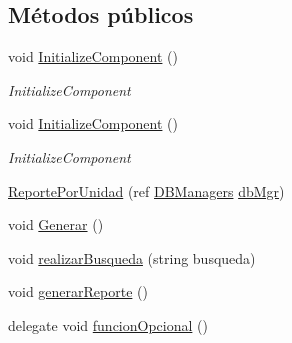 \subsection*{Métodos públicos}
\begin{DoxyCompactItemize}
\item 
void \hyperlink{class_proyecto___integrador__3_1_1_reportes_1_1_reporte_por_unidad_ac385ee013c86b8989058e38c41d813bc}{Initialize\-Component} ()
\begin{DoxyCompactList}\small\item\em Initialize\-Component \end{DoxyCompactList}\item 
void \hyperlink{class_proyecto___integrador__3_1_1_reportes_1_1_reporte_por_unidad_ac385ee013c86b8989058e38c41d813bc}{Initialize\-Component} ()
\begin{DoxyCompactList}\small\item\em Initialize\-Component \end{DoxyCompactList}\item 
\hyperlink{class_proyecto___integrador__3_1_1_reportes_1_1_reporte_por_unidad_a60d239679d1bf4748e5bbac0e633a36e}{Reporte\-Por\-Unidad} (ref \hyperlink{class_proyecto___integrador__3_1_1_d_b_managers}{D\-B\-Managers} \hyperlink{class_proyecto___integrador__3_1_1_reportes_1_1_reporte_por_unidad_abd68a91cd0ccdc0740d0f3db2126c1e6}{db\-Mgr})
\item 
void \hyperlink{class_proyecto___integrador__3_1_1_reportes_1_1_reporte_por_unidad_a781b2efaa6699e16f45ff2f9b56ff2d6}{Generar} ()
\item 
void \hyperlink{class_proyecto___integrador__3_1_1_reportes_1_1_reporte_por_unidad_a7fcbd0b72d999e44e7afbfed853f3243}{realizar\-Busqueda} (string busqueda)
\item 
void \hyperlink{class_proyecto___integrador__3_1_1_reportes_1_1_reporte_por_unidad_acd8b66b86327e444592d4bf1182a8767}{generar\-Reporte} ()
\item 
delegate void \hyperlink{class_proyecto___integrador__3_1_1_reportes_1_1_reporte_por_unidad_ac892258dc32e6a09c7acac315291ea09}{funcion\-Opcional} ()
\end{DoxyCompactItemize}

